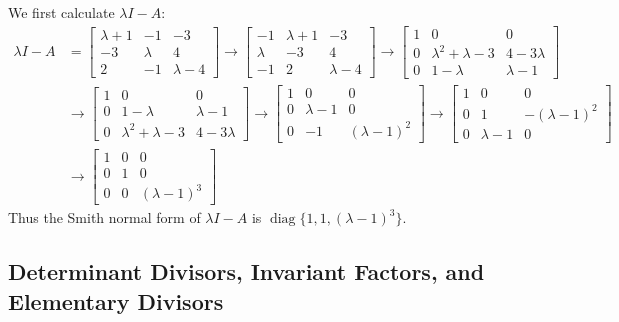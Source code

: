 \begin{solution}
  We first calculate $\lambda I - A$:
  \begin{align}
    \lambda I - A
    &=
    \begin{bmatrix}
      \lambda + 1 & -1 & -3\\
      -3 & \lambda & 4\\
      2 & -1 & \lambda - 4
    \end{bmatrix}
    \rightarrow 
    \begin{bmatrix}
      - 1 & \lambda + 1 & -3\\
      \lambda & -3 & 4\\
      - 1 & 2 & \lambda - 4
    \end{bmatrix}
    \rightarrow
    \begin{bmatrix}
      1 & 0 & 0\\
      0 & \lambda^2+\lambda-3 & 4-3\lambda\\
      0 & 1-\lambda & \lambda -1
    \end{bmatrix}\\
    &\rightarrow
    \begin{bmatrix}
      1 & 0 & 0\\
      0 & 1-\lambda & \lambda-1\\
      0 & \lambda^2 + \lambda - 3 & 4 - 3\lambda
    \end{bmatrix}
      \rightarrow
    \begin{bmatrix}
      1 & 0 & 0\\
      0 & \lambda-1 & 0\\
      0 & -1 & (\lambda-1)^2
    \end{bmatrix}
      \rightarrow
    \begin{bmatrix}
      1 & 0 & 0\\
      0 & 1 & -(\lambda - 1)^2\\
      0 & \lambda-1 & 0
    \end{bmatrix}\\
    &\rightarrow
    \begin{bmatrix}
      1 & 0 & 0\\
      0 & 1 & 0\\
      0 & 0 & (\lambda-1)^3
    \end{bmatrix}
  \end{align}
  Thus the Smith normal form of $\lambda I - A$ is $\operatorname{diag}\{1, 1,
  (\lambda - 1)^3\}$.
\end{solution}

\subsection{Determinant Divisors, Invariant Factors, and Elementary Divisors}

